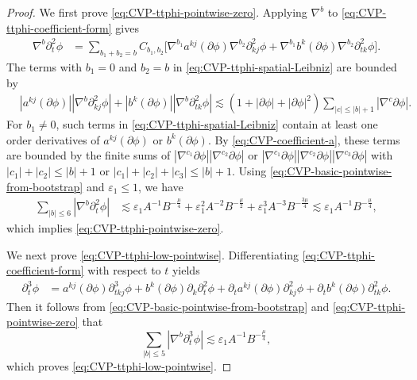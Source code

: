 \documentclass[11pt,twoside]{article}
\def\f{\frac}
\def\p{\partial}
\def\ve{\varepsilon}
\def\ls{\lesssim}
\theoremstyle{plain}
\theoremstyle{definition}
\theoremstyle{assumption}
\numberwithin{equation}{section}
\begin{document}
\begin{proof}
		
		We first prove \eqref{eq:CVP-ttphi-pointwise-zero}. Applying
		$\nabla^b$ to \eqref{eq:CVP-ttphi-coefficient-form} gives
		\begin{equation}\label{eq:CVP-ttphi-spatial-Leibniz}
			\begin{aligned}
				\nabla^b\p_t^2\phi
				&=
				\sum_{b_1+b_2=b}
				C_{b_1,b_2}
				\big[
				\nabla^{b_1}a^{kj}(\p\phi)
				\nabla^{b_2}\p_{kj}^2\phi
				+
				\nabla^{b_1}b^k(\p\phi)
				\nabla^{b_2}\p_{tk}^2\phi
				\big].
			\end{aligned}
		\end{equation}
		The terms with $b_1=0$ and $b_2=b$ in \eqref{eq:CVP-ttphi-spatial-Leibniz} are bounded by
		\begin{equation}
			\label{eq:CVP-ttphi-principal-pointwise}
			\begin{aligned}
				&
				|a^{kj}(\p\phi)|
				|\nabla^b\p_{kj}^2\phi|
				+
				|b^k(\p\phi)|
				|\nabla^b\p_{tk}^2\phi|
				\ls
				(1+|\p\phi|+|\p\phi|^2)\sum_{|c|\le |b|+1}
				|\nabla^c\p\phi|.
			\end{aligned}
		\end{equation}
		For $b_1\neq0$, such terms in \eqref{eq:CVP-ttphi-spatial-Leibniz} contain at least one order derivatives of $a^{kj}(\p\phi)$
        or $b^k(\p\phi)$. By \eqref{eq:CVP-coefficient-a}, these terms are bounded by the finite sums of
				$|\nabla^{c_1}\p\phi|
			|\nabla^{c_2}\p\phi|$
		or
		$|\nabla^{c_1}\p\phi||\nabla^{c_2}\p\phi||\nabla^{c_3}\p\phi|$
		with
		$
			|c_1|+|c_2|
			\le
			|b|+1
		$
		or
		$
			|c_1|+|c_2|+|c_3|
			\le
			|b|+1.
		$
		Using \eqref{eq:CVP-basic-pointwise-from-bootstrap} and
		$\ve_1\le1$, we have
		\begin{equation}
			\label{eq:CVP-ttphi-pointwise-intermediate}
			\begin{aligned}
				\sum_{|b|\le 6}|\nabla^b\p_t^2\phi|
				&\ls
				\ve_1A^{-1}B^{-\f\mu4}
				+
				\ve_1^2A^{-2}B^{-\f\mu2}
				+
				\ve_1^3A^{-3}B^{-\f{3\mu}4}
				\ls
				\ve_1A^{-1}B^{-\f\mu4},
			\end{aligned}
		\end{equation}
		which implies \eqref{eq:CVP-ttphi-pointwise-zero}.
		
		We next prove \eqref{eq:CVP-ttphi-low-pointwise}. Differentiating
		\eqref{eq:CVP-ttphi-coefficient-form} with respect to $t$ yields
		\begin{equation}
			\label{eq:CVP-tttphi-coefficient-form}
			\begin{aligned}
				\p_t^3\phi
				&=
				a^{kj}(\p\phi)\p_{tkj}^3\phi
				+
				b^k(\p\phi)\p_k\p_t^2\phi
				+
				\p_ta^{kj}(\p\phi)\p_{kj}^2\phi
				+
				\p_tb^k(\p\phi)\p_{tk}^2\phi.
			\end{aligned}
		\end{equation}
		Then it follows from
		\eqref{eq:CVP-basic-pointwise-from-bootstrap} and
		\eqref{eq:CVP-ttphi-pointwise-zero} that
		\begin{equation}
			\label{eq:CVP-tttphi-pointwise}
			\sum_{|b|\le 5}|\nabla^b\p_t^3\phi|
			\ls
			\ve_1A^{-1}B^{-\f\mu4},
		\end{equation}
		which proves
		\eqref{eq:CVP-ttphi-low-pointwise}.
		

\end{proof}
\end{document}

